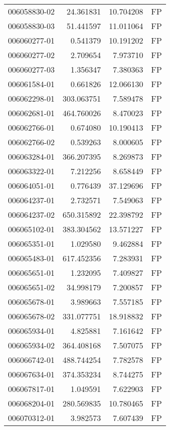 \begin{tabular}{lrrl}
006058830-02 &   24.361831 &    10.704208 &   FP \\
006058830-03 &   51.441597 &    11.011064 &   FP \\
006060277-01 &    0.541379 &    10.191202 &   FP \\
006060277-02 &    2.709654 &     7.973710 &   FP \\
006060277-03 &    1.356347 &     7.380363 &   FP \\
006061584-01 &    0.661826 &    12.066130 &   FP \\
006062298-01 &  303.063751 &     7.589478 &   FP \\
006062681-01 &  464.760026 &     8.470023 &   FP \\
006062766-01 &    0.674080 &    10.190413 &   FP \\
006062766-02 &    0.539263 &     8.000605 &   FP \\
006063284-01 &  366.207395 &     8.269873 &   FP \\
006063322-01 &    7.212256 &     8.658449 &   FP \\
006064051-01 &    0.776439 &    37.129696 &   FP \\
006064237-01 &    2.732571 &     7.549063 &   FP \\
006064237-02 &  650.315892 &    22.398792 &   FP \\
006065102-01 &  383.304562 &    13.571227 &   FP \\
006065351-01 &    1.029580 &     9.462884 &   FP \\
006065483-01 &  617.452356 &     7.283931 &   FP \\
006065651-01 &    1.232095 &     7.409827 &   FP \\
006065651-02 &   34.998179 &     7.200857 &   FP \\
006065678-01 &    3.989663 &     7.557185 &   FP \\
006065678-02 &  331.077751 &    18.918832 &   FP \\
006065934-01 &    4.825881 &     7.161642 &   FP \\
006065934-02 &  364.408168 &     7.507075 &   FP \\
006066742-01 &  488.744254 &     7.782578 &   FP \\
006067634-01 &  374.353234 &     8.744275 &   FP \\
006067817-01 &    1.049591 &     7.622903 &   FP \\
006068204-01 &  280.569835 &    10.780465 &   FP \\
006070312-01 &    3.982573 &     7.607439 &   FP \\

\end{tabular}
